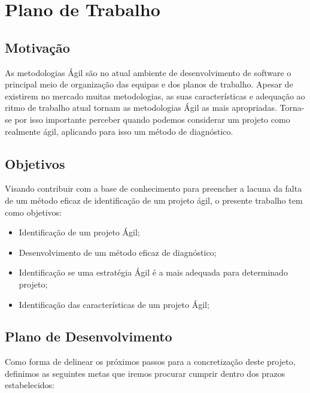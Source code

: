 \chapter{Plano de Trabalho}
\label{cht:planodetrabalho}


\section{Motivação}

As metodologias Ágil são no atual ambiente de desenvolvimento de software o principal meio de organização das equipas e dos planos de trabalho. Apesar de existirem no mercado muitas metodologias, as suas características e adequação ao ritmo de trabalho atual tornam as metodologias Ágil as mais apropriadas. Torna-se por isso importante perceber quando podemos considerar um projeto como realmente ágil, aplicando para isso um método de diagnóstico.

\section{Objetivos}

Visando contribuir com a base de conhecimento para preencher a lacuna da falta de um método eficaz de identificação de um projeto ágil, o presente trabalho tem como objetivos:

\begin{itemize}
    \item Identificação de um projeto Ágil;
    \item Desenvolvimento de um método eficaz de diagnóstico;
    \item Identificação se uma estratégia Ágil é a mais adequada para determinado projeto;
    \item Identificação das características de um projeto Ágil;
\end{itemize}

\section{Plano de Desenvolvimento}

Como forma de delinear os próximos passos para a concretização deste projeto, definimos as seguintes metas que iremos procurar cumprir dentro dos prazos estabelecidos:


